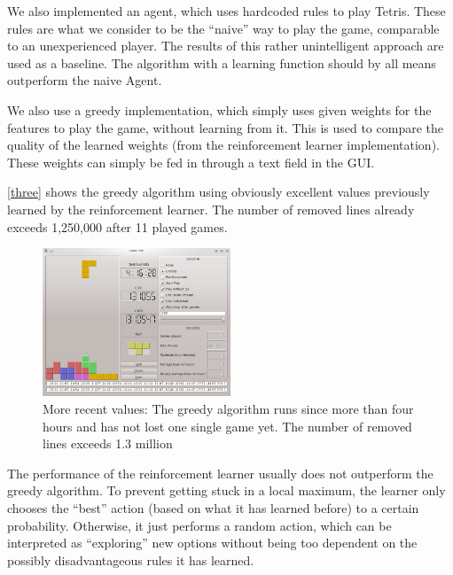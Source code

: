\documentclass{ml}
\begin{document}
We also implemented an agent, which uses hardcoded rules to play Tetris. 
These rules are what we consider to be the ``naive'' way to play the game, comparable to an unexperienced player. 
The results of this rather unintelligent approach are used as a baseline. 
The algorithm with a learning function should by all means outperform the naive Agent.

We also use a greedy implementation, which simply uses given weights for the features to play the game, without learning from it. 
This is used to compare the quality of the learned weights (from the reinforcement learner implementation). 
These weights can simply be fed in through a text field in the GUI. 

\autoref{three} shows the greedy algorithm using obviously excellent values previously learned by the reinforcement learner.
The number of removed lines already exceeds 1,250,000 after 11 played games. 

\begin{figure}
\vspace{-10pt}
  \begin{center}
    \includegraphics[width=0.5\textwidth]{img/restit4.jpg}
  \end{center}
  \vspace{-10pt}
  \caption{\small{More recent values: The greedy algorithm runs since more than four hours and has not lost one single game yet. The number of removed lines exceeds 1.3 million}}
  \label{four}
  \vspace{-10pt}
\end{figure}

The performance of the reinforcement learner usually does not outperform the greedy algorithm. 
To prevent getting stuck in a local maximum, the learner only chooses the ``best'' action (based on what it has learned before) to a certain probability. 
Otherwise, it just performs a random action, which can be interpreted as ``exploring'' new options without being too dependent on the possibly disadvantageous rules it has learned. 
\end{document}
